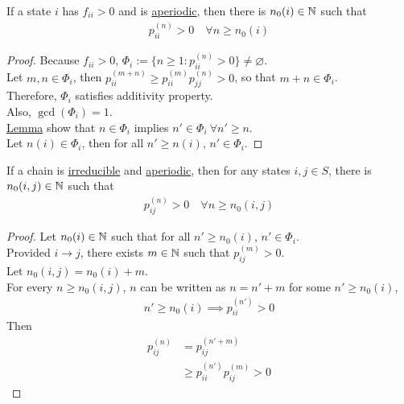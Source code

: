 \documentclass{article}
\newcommand{\upn}[0]{^{(n)}}
\begin{document}
	\begin{proposition}
		If a state $i$ has $f_{ii} > 0$ and is \ul{aperiodic}, then there is $n_0(i) \in \mathbb{N}$ such that
		\begin{align}
			p_{ii}\upn > 0\quad \forall n \geq n_0(i)
		\end{align}
	\end{proposition}
	
	\begin{proof}
		Because $f_{ii} > 0$, $\Phi_i := \{n \geq 1: p_{ii}\upn > 0\} \neq \varnothing$. \\
		Let $m, n \in \Phi_i$, then $p_{ii}^{(m+n)} \geq p_{ii}^{(m)} p_{jj}^{(n)} > 0$, so that $m + n \in \Phi_i$. \\
		Therefore, $\Phi_i$ satisfies additivity property. \\
		Also, $\gcd(\Phi_i) = 1$. \\
		\ul{Lemma} show that $n \in \Phi_i$ implies $n' \in \Phi_i\ \forall n' \geq n$. \\
		Let $n(i) \in \Phi_i$, then for all $n' \geq n(i)$, $n' \in \Phi_i$.
	\end{proof}

	\begin{corollary}
		If a chain is \ul{irreducible} and \ul{aperiodic}, then for any states $i, j \in S$, there is $n_0(i, j) \in \mathbb{N}$ such that
		\begin{align}
			p_{ij}\upn > 0\quad \forall n \geq n_0(i, j)
		\end{align}
	\end{corollary}

	\begin{proof}
		Let $n_0(i) \in \mathbb{N}$ such that for all $n' \geq n_0(i)$, $n' \in \Phi_i$. \\
		Provided $i \rightarrow j$, there exists $m \in \mathbb{N}$ such that $p_{ij}^{(m)} >0$. \\
		Let $n_0(i, j) = n_0(i) + m$. \\
		For every $n \geq n_0(i, j)$, $n$ can be written as $n = n' + m$ for some $n' \geq n_0(i)$, 
		\begin{align}
			n' \geq n_0(i) \implies p_{ii}^{(n')} > 0
		\end{align}
		Then
		\begin{align}
			p_{ij}\upn &= p_{ij}^{(n' + m)} \\
			&\geq p_{ii}^{(n')} p_{ij}^{(m)} > 0
		\end{align}
	\end{proof}
	
\end{document}
